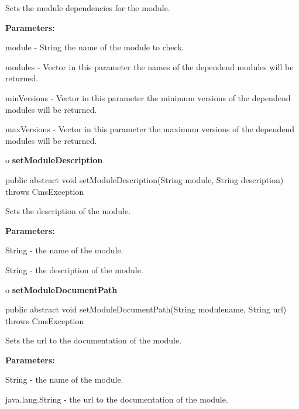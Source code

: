 \begin{description}
\htmlDD Sets the module dependencies for the module. 

\begin{description}
\item {\bf Parameters:}  

module - String the name of the module to check.  

modules - Vector in this parameter the names of the dependend modules will be
returned.  

minVersions - Vector in this parameter the minimum versions of the dependend
modules will be returned.  

maxVersions - Vector in this parameter the maximum versions of the dependend
modules will be returned.  
\end{description}

\end{description}

o {\bf setModuleDescription} 

\begin{PRE}
 public abstract void setModuleDescription(String module,
                                           String description) throws CmsException
\end{PRE}

\begin{description}
\htmlDD Sets the description of the module. 

\begin{description}
\item {\bf Parameters:}  

String - the name of the module.  

String - the description of the module.  
\end{description}

\end{description}

o {\bf setModuleDocumentPath} 

\begin{PRE}
 public abstract void setModuleDocumentPath(String modulename,
                                            String url) throws CmsException
\end{PRE}

\begin{description}
\htmlDD Sets the url to the documentation of the module. 

\begin{description}
\item {\bf Parameters:}  

String - the name of the module.  

java.lang.String - the url to the documentation of the module.  
\end{description}

\end{description}

